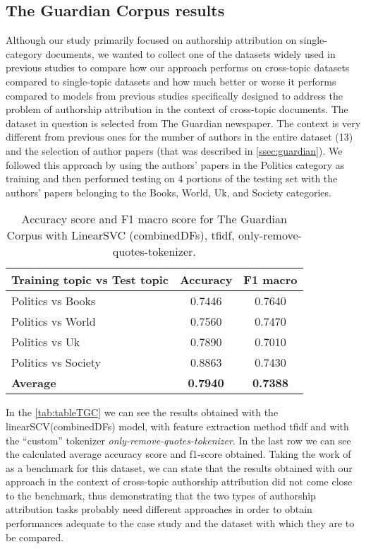 \subsection{The Guardian Corpus results}
Although our study primarily focused on authorship attribution on single-category documents, we wanted to collect one of the datasets widely used in previous studies to compare how our approach performs on cross-topic datasets compared to single-topic datasets and how much better or worse it performs compared to models from previous studies specifically designed to address the problem of authorship attribution in the context of cross-topic documents.
The dataset in question is selected from The Guardian newspaper. The context is very different from previous ones for the number of authors in the entire dataset (13) and the selection of author papers (that was described in \autoref{ssec:guardian}).
We followed this approach by using the authors' papers in the Politics category as training and then performed testing on 4 portions of the testing set with the authors' papers belonging to the Books, World, Uk, and Society categories.

\begin{table}[h!]
	\begin{center}  
		\caption[The Guardian Corpus Results]{Accuracy score and F1 macro score for The Guardian Corpus with LinearSVC (combinedDFs), tfidf, only-remove-quotes-tokenizer.} 
		\label{tab:tableTGC}
		\begin{tabular}{| p{5 cm} | c | c |}
			\hline 
			Training topic vs Test topic & Accuracy & F1 macro \\
			\hline
			Politics vs Books & 0.7446 & 0.7640 \\ \hline
			Politics vs World & 0.7560 & 0.7470 \\ \hline
			Politics vs Uk & 0.7890 & 0.7010 \\ \hline
			Politics vs Society & 0.8863 & 0.7430 \\ \hline
			\textbf{Average} & \textbf{0.7940} & \textbf{0.7388} \\ \hline
		\end{tabular} 
	\end{center}
\end{table}

In the \autoref{tab:tableTGC} we can see the results obtained with the linearSCV(combinedDFs) model, with feature extraction method tfidf and with the \enquote{custom} tokenizer \textit{only-remove-quotes-tokenizer}.
In the last row we can see the calculated average accuracy score and f1-score obtained.
Taking the work of \cite{posadas2017application} as a benchmark for this dataset, we can state that the results obtained with our approach in the context of cross-topic authorship attribution did not come close to the benchmark, thus demonstrating that the two types of authorship attribution tasks probably need different approaches in order to obtain performances adequate to the case study and the dataset with which they are to be compared.\\

